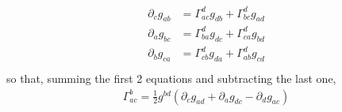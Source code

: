 \documentclass[letterpaper,10pt,english]{jupyterBook}
\begin{document}
\sphinxAtStartPar
{}
\begin{equation*}
\begin{split}\begin{aligned}
  \partial_c g_{ab} & = \Gamma_{ac}^{d} g_{db} + \Gamma_{bc}^{d} g_{ad} \\
  \partial_a g_{bc} & = \Gamma_{ba}^{d} g_{dc} + \Gamma_{ca}^{d} g_{bd} \\
  \partial_b g_{ca} & = \Gamma_{cb}^{d} g_{da} + \Gamma_{ab}^{d} g_{cd} \\
\end{aligned}\end{split}
\end{equation*}
\sphinxAtStartPar
so that, summing the first 2 equations and subtracting the last one,
\begin{equation}\label{equation:ch/relativity-general/differential-geometry:eqn:differential-geometry:gamma:g}
\begin{split}\Gamma_{ac}^{b} = \frac{1}{2} g^{bd} \left( \partial_c g_{ad} + \partial_a g_{dc} - \partial_{d} g_{ac} \right)\end{split}
\end{equation}
\end{document}
